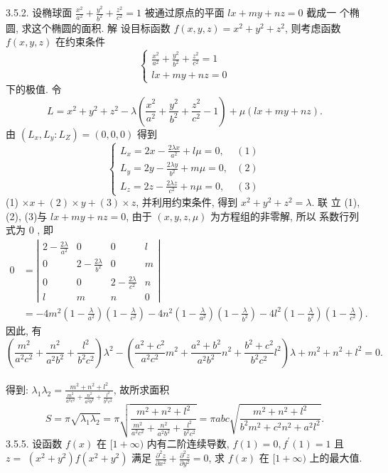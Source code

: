 \documentclass[a4paper,11pt,UTF8]{article}
\begin{document}
3.5.2. 设椭球面 $\frac{x^2}{a^2}+\frac{y^2}{b^2}+\frac{z^2}{c^2}=1$ 被通过原点的平面 $l x+m y+n z=0$ 截成一 个椭圆, 求这个椭圆的面积.
解 设目标函数 $f(x, y, z)=x^2+y^2+z^2$, 则考虑函数 $f(x, y, z)$ 在约束条件
$$
\left\{\begin{array}{l}
	\frac{x^2}{a^2}+\frac{y^2}{b^2}+\frac{z^2}{c^2}=1 \\
	l x+m y+n z=0
\end{array}\right.
$$
下的极值. 令
$$
L=x^2+y^2+z^2-\lambda\left(\frac{x^2}{a^2}+\frac{y^2}{b^2}+\frac{z^2}{c^2}-1\right)+\mu(l x+m y+n z) .
$$
由 $\left(L_x, L_y: L_Z\right)=(0,0,0)$ 得到
$$
\begin{cases}L_x=2 x-\frac{2 \lambda x}{a^2}+l \mu=0, & (1) \\ L_y=2 y-\frac{2 \lambda y}{b^2}+m \mu=0, & (2) \\ L_z=2 z-\frac{2 \lambda z}{c^2}+n \mu=0, & (3)\end{cases}
$$
(1) $\times x+(2) \times y+(3) \times z$, 并利用约束条件, 得到 $x^2+y^2+z^2=\lambda$. 联 立 (1), (2), (3)与 $l x+m y+n z=0$, 由于 $(x, y, z, \mu)$ 为方程组的非零解, 所以 系数行列式为 0 , 即
$$
\begin{aligned}
	0 & =\left|\begin{array}{cccc}
		2-\frac{2 \lambda}{a^2} & 0 & 0 & l \\
		0 & 2-\frac{2 \lambda}{b^2} & 0 & m \\
		0 & 0 & 2-\frac{2 \lambda}{c^2} & n \\
		l & m & n & 0
	\end{array}\right| \\
	& =-4 m^2\left(1-\frac{\lambda}{a^2}\right)\left(1-\frac{\lambda}{c^2}\right)-4 n^2\left(1-\frac{\lambda}{a^2}\right)\left(1-\frac{\lambda}{b^2}\right)-4 l^2\left(1-\frac{\lambda}{b^2}\right)\left(1-\frac{\lambda}{c^2}\right) .
\end{aligned}
$$
因此, 有
$$
\left(\frac{m^2}{a^2 c^2}+\frac{n^2}{a^2 b^2}+\frac{l^2}{b^2 c^2}\right) \lambda^2-\left(\frac{a^2+c^2}{a^2 c^2} m^2+\frac{a^2+b^2}{a^2 b^2} n^2+\frac{b^2+c^2}{b^2 c^2} l^2\right) \lambda+m^2+n^2+l^2=0 .
$$\\
得到: $\lambda_1 \lambda_2=\frac{m^2+n^2+l^2}{\frac{m^2}{a^2 c^2}+\frac{n^2}{a^2 b^2}+\frac{l^2}{b^2 c^2}}$, 故所求面积
$$
S=\pi \sqrt{\lambda_1 \lambda_2}=\pi \sqrt{\frac{m^2+n^2+l^2}{\frac{m^2}{a^2 c^2}+\frac{n^2}{a^2 b^2}+\frac{l^2}{b^2 c^2}}}=\pi a b c \sqrt{\frac{m^2+n^2+l^2}{b^2 m^2+c^2 n^2+a^2 l^2}} .
$$
3.5.5. 设函数 $f(x)$ 在 $[1+\infty)$ 内有二阶连续导数, $f(1)=0, f^{\prime}(1)=1$ 且 $z=$ $\left(x^2+y^2\right) f\left(x^2+y^2\right)$ 满足 $\frac{\partial^2 z}{\partial x^2}+\frac{\partial^2 z}{\partial y^2}=0$, 求 $f(x)$ 在 $[1+\infty)$ 上的最大值.\\
\end{document}
